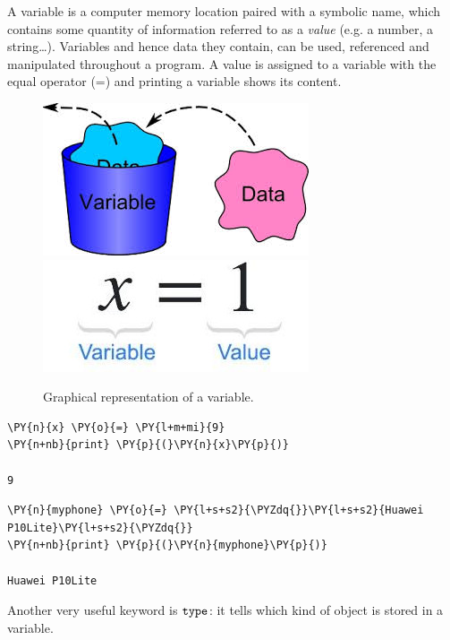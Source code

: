 A variable is a computer memory location paired with a symbolic name, which contains some quantity of information referred to as a \emph{value} (e.g. a number, a string\ldots). Variables and hence data they contain, can be used, referenced and manipulated throughout a program.
A value is assigned to a variable with the equal operator (=) and printing a variable shows its content. 

\begin{figure}[h]
\centering
\includegraphics[width=0.35\linewidth]{figures/var1.jpeg}\\
\includegraphics[width=0.35\linewidth]{figures/var2.jpeg}
\caption{Graphical representation of a variable.}
\end{figure}

\begin{tcolorbox}[breakable, size=fbox, boxrule=1pt, pad at break*=1mm, colback=cellbackground, colframe=cellborder]
\begin{Verbatim}[commandchars=\\\{\}]
\PY{n}{x} \PY{o}{=} \PY{l+m+mi}{9}
\PY{n+nb}{print} \PY{p}{(}\PY{n}{x}\PY{p}{)}

9
\end{Verbatim}
\end{tcolorbox}

\begin{tcolorbox}[breakable, size=fbox, boxrule=1pt, pad at break*=1mm, colback=cellbackground, colframe=cellborder]
\begin{Verbatim}[commandchars=\\\{\}]
\PY{n}{myphone} \PY{o}{=} \PY{l+s+s2}{\PYZdq{}}\PY{l+s+s2}{Huawei P10Lite}\PY{l+s+s2}{\PYZdq{}}
\PY{n+nb}{print} \PY{p}{(}\PY{n}{myphone}\PY{p}{)}

Huawei P10Lite
\end{Verbatim}
\end{tcolorbox}

Another very useful keyword is \(\tt{type}\): it tells which kind of object is stored in a variable.

